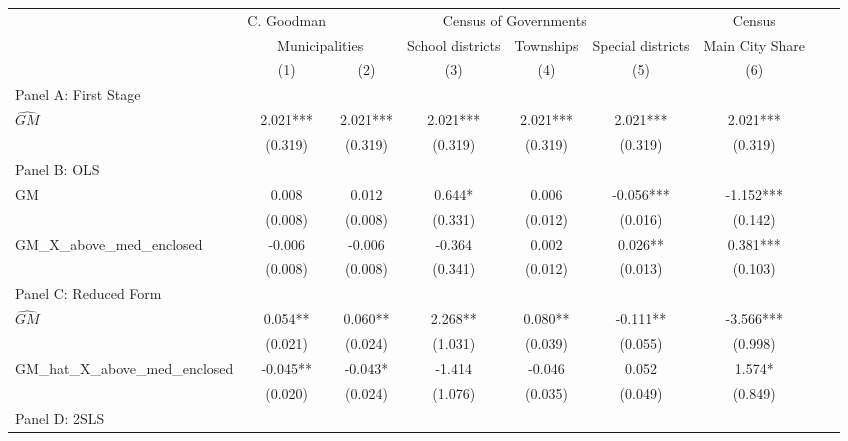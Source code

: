  \begin{tabular}{l*{8}{c}} \toprule
&\multicolumn{1}{c}{C. Goodman}&\multicolumn{4}{c}{Census of Governments}&\multicolumn{1}{c}{Census}\\\cmidrule(lr){2-2}\cmidrule(lr){3-6}\cmidrule(lr){7-7}
&\multicolumn{2}{c}{Municipalities}&\multicolumn{1}{c}{School districts}&\multicolumn{1}{c}{Townships}&\multicolumn{1}{c}{Special districts}&\multicolumn{1}{c}{Main City Share}\\\cmidrule(lr){2-3}\cmidrule(lr){4-6}\cmidrule(lr){7-7}
&\multicolumn{1}{c}{(1)}&\multicolumn{1}{c}{(2)}&\multicolumn{1}{c}{(3)}&\multicolumn{1}{c}{(4)}&\multicolumn{1}{c}{(5)}&\multicolumn{1}{c}{(6)}\\
\cmidrule(lr){1-7}
\multicolumn{6}{l}{Panel A: First Stage}\\
\cmidrule(lr){1-7}
$\widehat{GM}$  &    2.021***&    2.021***&    2.021***&    2.021***&    2.021***&    2.021***\\
                &  (0.319)   &  (0.319)   &  (0.319)   &  (0.319)   &  (0.319)   &  (0.319)   \\
\cmidrule(lr){1-7}
\multicolumn{6}{l}{Panel B: OLS}\\
\cmidrule(lr){1-7}
GM              &    0.008   &    0.012   &    0.644*  &    0.006   &   -0.056***&   -1.152***\\
                &  (0.008)   &  (0.008)   &  (0.331)   &  (0.012)   &  (0.016)   &  (0.142)   \\
\addlinespace
GM\_X\_above\_med\_enclosed&   -0.006   &   -0.006   &   -0.364   &    0.002   &    0.026** &    0.381***\\
                &  (0.008)   &  (0.008)   &  (0.341)   &  (0.012)   &  (0.013)   &  (0.103)   \\
\cmidrule(lr){1-7}
\multicolumn{6}{l}{Panel C: Reduced Form}\\
\cmidrule(lr){1-7}
$\widehat{GM}$  &    0.054** &    0.060** &    2.268** &    0.080** &   -0.111** &   -3.566***\\
                &  (0.021)   &  (0.024)   &  (1.031)   &  (0.039)   &  (0.055)   &  (0.998)   \\
\addlinespace
GM\_hat\_X\_above\_med\_enclosed&   -0.045** &   -0.043*  &   -1.414   &   -0.046   &    0.052   &    1.574*  \\
                &  (0.020)   &  (0.024)   &  (1.076)   &  (0.035)   &  (0.049)   &  (0.849)   \\
\cmidrule(lr){1-7}
\multicolumn{6}{l}{Panel D: 2SLS}\\

\end{tabular}
